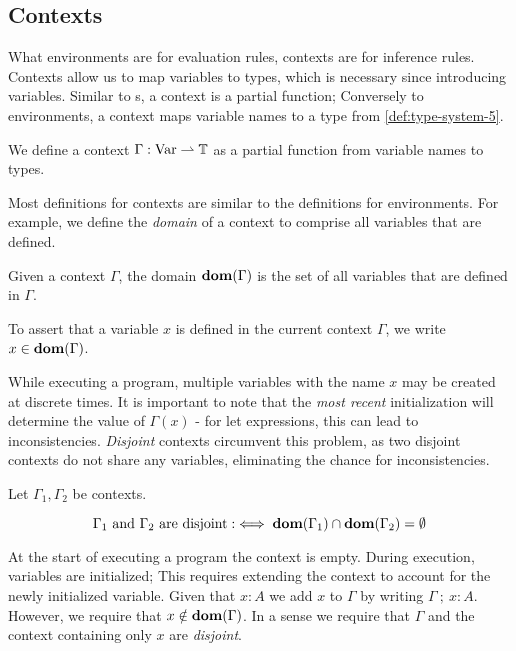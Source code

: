 \subsection{Contexts}

What environments are for evaluation rules, contexts are for inference rules. Contexts allow us to map variables to types, which is necessary since introducing variables. Similar to s, a context is a partial function; Conversely to environments, a context maps variable names to a type from \cref{def:type-system-5}.

\begin{definition}[Context]\label{def:context}
   We define a context \(\Gamma : \text{Var} \rightharpoonup \mathbb{T}\) as a partial function from variable names to types. 
\end{definition}

Most definitions for contexts are similar to the definitions for environments. For example, we define the \emph{domain} of a context to comprise all variables that are defined.


\begin{definition}\label{def:context-domain}
   Given a context \(\Gamma\), the domain \(\textbf{dom}(\Gamma)\) is the set of all variables that are defined in \(\Gamma\).
\end{definition}

To assert that a variable \(x\) is defined in the current context \(\Gamma\), we write \(x \in \textbf{dom}(\Gamma)\).

While executing a program, multiple variables with the name \(x\) may be created at discrete times. It is important to note that the \emph{most recent} initialization will determine the value of \(\Gamma(x)\) - for let expressions, this can lead to inconsistencies. \emph{Disjoint} contexts circumvent this problem, as two disjoint contexts do not share any variables, eliminating the chance for inconsistencies.

\begin{definition}\label{def:disjoint-contexts}
   Let \(\Gamma_1, \Gamma_2\) be contexts. 

   \[
      \Gamma_1 \text{ and } \Gamma_2 \text{ are disjoint} :\iff \textbf{dom}(\Gamma_1) \cap \textbf{dom}(\Gamma_2) = \emptyset
   \]
\end{definition}

At the start of executing a program the context is empty. During execution, variables are initialized; This requires extending the context to account for the newly initialized variable. Given that \(x : A\) we add \(x\) to \(\Gamma\) by writing \(\Gamma~;~x : A\). However, we require that \(x \notin \textbf{dom}(\Gamma)\). In a sense we require that \(\Gamma\) and the context containing only \(x\) are \emph{disjoint}.

